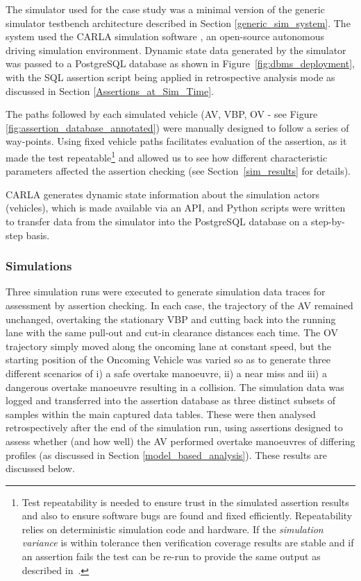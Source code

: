 The simulator used for the case study was a minimal version of the generic simulator testbench architecture described in Section \ref{generic_sim_system}. The system used the CARLA simulation software \cite{CarlaSimulator}, an open-source autonomous driving simulation environment. Dynamic state data generated by the simulator was passed to a PostgreSQL database as shown in Figure~\ref{fig:dbms_deployment}, with the SQL assertion script being applied in retrospective analysis mode as discussed in Section \ref{Assertions_at_Sim_Time}.

The paths followed by each simulated vehicle (AV, VBP, OV - see Figure \ref{fig:assertion_database_annotated}) were manually designed to follow a series of way-points. Using fixed vehicle paths facilitates evaluation of the assertion, as it made the test repeatable\footnote{Test repeatability is needed to ensure trust in the simulated assertion results and also to ensure software bugs are found and fixed efficiently. Repeatability relies on deterministic simulation code and hardware. If the \emph{simulation variance} is within tolerance then verification coverage results are stable and if an assertion fails the test can be re-run to provide the same output as described in~\cite{chance2021}.} and allowed us to see how different characteristic parameters affected the assertion checking (see Section~\ref{sim_results} for details). 


CARLA generates dynamic state information about the simulation actors (vehicles), which is made available via an API, and Python scripts were written to transfer data from the simulator into the PostgreSQL database on a step-by-step basis.

\subsubsection{Simulations}

Three simulation runs were executed to generate simulation data traces for assessment by assertion checking. In each case, the trajectory of the AV remained unchanged, overtaking the stationary VBP and cutting back into the running lane with the same pull-out and cut-in clearance distances each time. The OV trajectory simply moved along the oncoming lane at constant speed, but the starting position of the Oncoming Vehicle was varied so as to generate three different scenarios of i) a safe overtake manoeuvre, ii) a near miss and iii) a dangerous overtake manoeuvre resulting in a collision. The simulation data was logged and transferred into the assertion database as three distinct subsets of samples within the main captured data tables. These were then analysed retrospectively after the end of the simulation run, using assertions designed to assess whether (and how well) the AV performed overtake manoeuvres of differing profiles (as discussed in Section \ref{model_based_analysis}). These results are discussed below.

